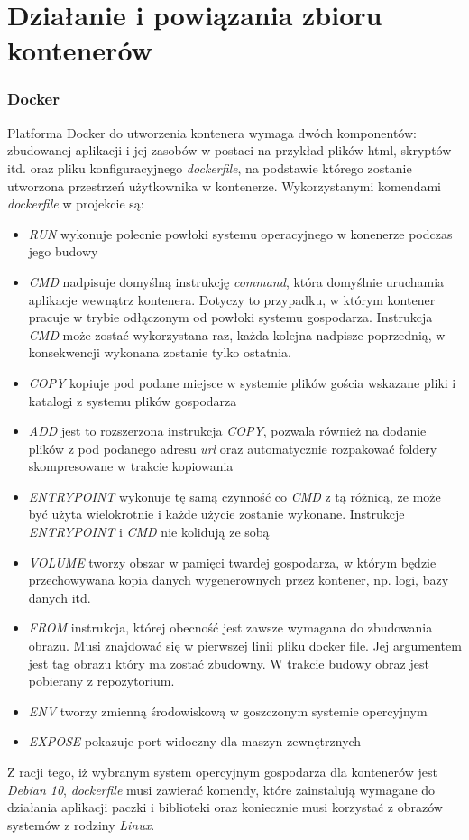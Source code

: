 \documentclass[polish, a4paper, 12pt, oneside]{book}
\begin{document}
\section{Działanie i powiązania zbioru kontenerów}
\subsubsection{Docker}
Platforma Docker do utworzenia kontenera wymaga dwóch komponentów: zbudowanej aplikacji i jej zasobów w postaci na przykład plików html, skryptów itd. oraz pliku konfiguracyjnego \textit{dockerfile}, na podstawie którego zostanie utworzona przestrzeń użytkownika w kontenerze. Wykorzystanymi komendami \textit{dockerfile} w projekcie są:
\begin{itemize}[noitemsep]
	\item \textit{RUN} wykonuje polecnie powłoki systemu operacyjnego w konenerze podczas jego budowy
	\item \textit{CMD} nadpisuje domyślną instrukcję \textit{command}, która domyślnie uruchamia aplikacje wewnątrz kontenera. Dotyczy to przypadku, w którym kontener pracuje w trybie odłączonym od powłoki systemu gospodarza. Instrukcja \textit{CMD} może zostać wykorzystana raz, każda kolejna nadpisze poprzednią, w konsekwencji wykonana zostanie tylko ostatnia.
	\item \textit{COPY} kopiuje pod podane miejsce w systemie plików gościa wskazane pliki i katalogi z systemu plików gospodarza
	\item \textit{ADD} jest to rozszerzona instrukcja \textit{COPY}, pozwala również na dodanie plików z pod podanego adresu \textit{url} oraz automatycznie rozpakować foldery skompresowane w trakcie kopiowania
	\item \textit{ENTRYPOINT} wykonuje tę samą czynność co \textit{CMD} z tą różnicą, że może być użyta wielokrotnie i każde użycie zostanie wykonane. Instrukcje \textit{ENTRYPOINT} i \textit{CMD} nie kolidują ze sobą
	\item \textit{VOLUME} tworzy obszar w pamięci twardej gospodarza, w którym będzie przechowywana kopia danych wygenerownych przez kontener, np. logi, bazy danych itd.
	\item \textit{FROM} instrukcja, której obecność jest zawsze wymagana do zbudowania obrazu. Musi znajdować się w pierwszej linii pliku docker file. Jej argumentem jest tag obrazu który ma zostać zbudowny. W trakcie budowy obraz jest pobierany z repozytorium.
	\item \textit{ENV} tworzy zmienną środowiskową w goszczonym systemie opercyjnym
	\item \textit{EXPOSE} pokazuje port widoczny dla maszyn zewnętrznych
\end{itemize}
Z racji tego, iż wybranym system opercyjnym gospodarza dla kontenerów jest \textit{Debian 10}\cite{debian10}, \textit{dockerfile} musi zawierać komendy, które zainstalują wymagane do działania aplikacji paczki i biblioteki oraz koniecznie musi korzystać z obrazów systemów z rodziny \textit{Linux}.
\end{document}
